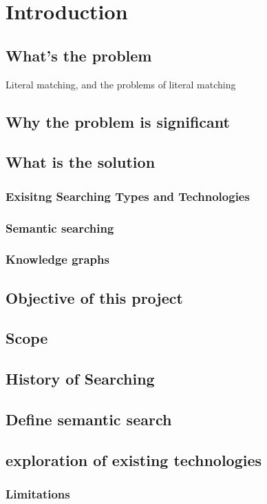 \chapter{Introduction}\label{cha:introduction}
\section{What's the problem} %
Literal matching, and the problems of literal matching
\section{Why the problem is significant}
\section{What is the solution}
\subsection{Exisitng Searching Types and Technologies}
\subsection{Semantic searching}
\subsection{Knowledge graphs}
\section{Objective of this project}
\section{Scope}

\section{History of Searching}
\section{Define semantic search}
\section{exploration of existing technologies}

\subsection{Limitations}


